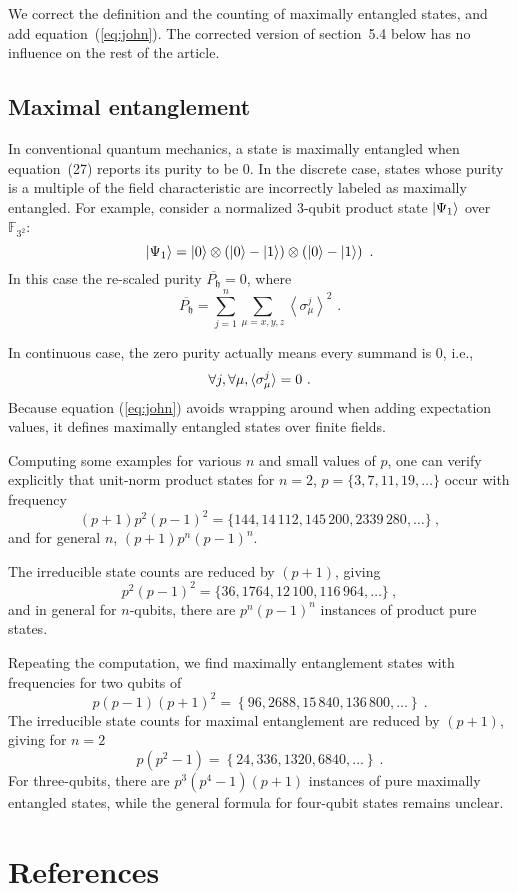 \documentclass{iopart}
\newcommand{\ff}[1]{\mathbb{F}_{#1}}
\def\fh{\mathfrak{h}}
\begin{document}
We correct the definition and the counting of maximally entangled
states, and add equation~(\ref{eq:john}). The corrected version
of section~5.4 below has no influence on the rest of the article. 


\subsection{Maximal entanglement}

In conventional quantum mechanics, a state is maximally entangled
when equation~(27) reports its purity to be 0. In the discrete case,
states whose purity is a multiple of the field characteristic are
incorrectly labeled as maximally entangled. For example, consider
a normalized 3-qubit product state $\ket{\Psi_{1}}$ over $\ff{3^{2}}$:
\[
\ket{\Psi_{1}}=\ket{0}\otimes\left(\ket{0}-\ket{1}\right)\otimes\left(\ket{0}-\ket{1}\right)\textrm{ .}
\]
In this case the re-scaled purity $\overline{P_{\fh}}=0$, where 
\[
\overline{P_{\fh}}=\sum_{j=1}^{n}\sum_{\mu=x,y,z}\left\langle \sigma_{\mu}^{j}\right\rangle ^{2}\textrm{ .}
\]


In continuous case, the zero purity actually means every summand is
$0$, i.e., 
\begin{equation}
\forall j,\forall\mu,\braket{\sigma_{\mu}^{j}}=0\textrm{ .}\label{eq:john}
\end{equation}
Because equation (\ref{eq:john}) avoids wrapping around when adding
expectation values, it defines maximally entangled states over finite
fields.


Computing some examples for various $n$ and small values of $p$,
one can verify explicitly that unit-norm product states for $n=2$,
$p=\{3,7,11,19,\ldots\}$ occur with frequency 
\[
(p+1)p^{2}(p-1)^{2}=\{144,14\,112,145\,200,2339\,280,\ldots\}\ ,
\]
and for general $n$, $(p+1)p^{n}(p-1)^{n}$.

The irreducible state counts are reduced by $(p+1)$, giving 
\[
p^{2}(p-1)^{2}=\{36,1764,12\,100,116\,964,\ldots\}\ ,
\]
and in general for $n$-qubits, there are $p^{n}\left(p-1\right)^{n}$
instances of product pure states.

Repeating the computation, we find maximally entanglement states with
frequencies for two qubits of 
\[
p\left(p-1\right)\left(p+1\right)^{2}=\left\{ 96,2688,15\,840,136\,800,\ldots\right\} \ .
\]
The irreducible state counts for maximal entanglement are reduced
by $\left(p+1\right)$, giving for $n=2$ 
\[
p\left(p^{2}-1\right)=\left\{ 24,336,1320,6840,\ldots\right\} \ .
\]
For three-qubits, there are $p^{3}\left(p^{4}-1\right)\left(p+1\right)$
instances of pure maximally entangled states, while the general formula
for four-qubit states remains unclear.



\section*{References}

{}



\end{document}

